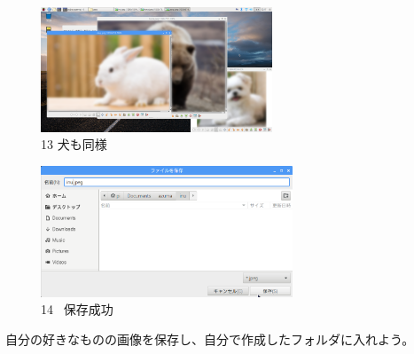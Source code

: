 \documentclass[a4paper,12pt]{jarticle}
\begin{document}
\begin{figure}[t]
  \begin{minipage}{\textwidth}
    \begin{minipage}{7.22cm}
      \includegraphics[width=6.911cm]{textbook-img105.png}\\
      13 犬も同様
    \end{minipage}
    \begin{minipage}{2.582cm}
    \end{minipage}
    \begin{minipage}{7.665cm}
      \includegraphics[width=7.527cm]{textbook-img104.png}\\
      14 \ 保存成功
    \end{minipage}
  \end{minipage}


  \centering
\end{figure}

\bigskip

\theQuestion\label{Q:hasAnswer02-6}

自分の好きなものの画像を保存し、自分で作成したフォルダに入れよう。

\clearpage
\end{document}
